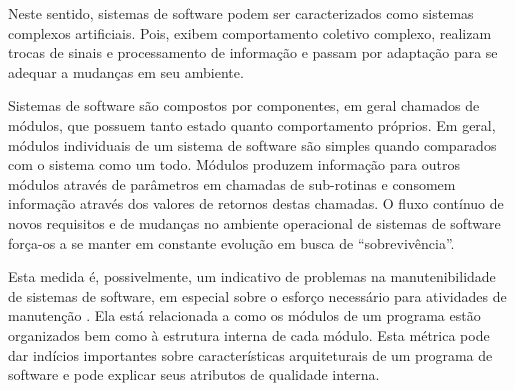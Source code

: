 Neste sentido, sistemas de software podem ser caracterizados como sistemas
complexos artificiais. Pois, exibem comportamento coletivo complexo, realizam
trocas de sinais e processamento de informação e passam por adaptação para se
adequar a mudanças em seu ambiente.

Sistemas de software são compostos por componentes, em geral chamados de
módulos, que possuem tanto estado quanto comportamento próprios. Em geral,
módulos individuais de um sistema de software são simples quando comparados com
o sistema como um todo. Módulos produzem informação para outros módulos
através de parâmetros em chamadas de sub-rotinas e consomem informação através
dos valores de retornos destas chamadas. O fluxo contínuo de novos requisitos e
de mudanças no ambiente operacional de sistemas de software força-os a se
manter em constante evolução em busca de “sobrevivência”.

Esta medida é, possivelmente, um indicativo de problemas na manutenibilidade de
sistemas de software, em especial sobre o esforço necessário para atividades de
manutenção \cite{Terceiro2012}. Ela está relacionada a como os módulos de um
programa estão organizados bem como à estrutura interna de cada módulo. Esta
métrica pode dar indícios importantes sobre características arquiteturais de um
programa de software e pode explicar seus atributos de qualidade interna.

